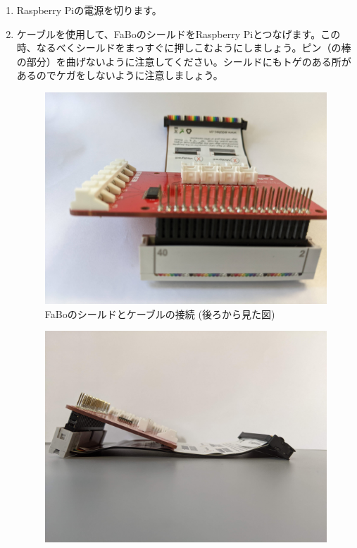 \begin{enumerate}
  \item Raspberry Piの電源を切ります。\\
  \item ケーブルを使用して、FaBoのシールドをRaspberry Piとつなげます。この時、なるべくシールドをまっすぐに押しこむようにしましょう。ピン（の棒の部分）を曲げないように注意してください。シールドにもトゲのある所があるのでケガをしないように注意しましょう。\\
  \begin{minipage}[b]{0.4\linewidth}
    \begin{figure}[H]
      \centering
      \includegraphics[width=.8\hsize]{images/chap05/fabo_and_cable_rearview.jpg}
      \caption{FaBoのシールドとケーブルの接続 (後ろから見た図)}
    \end{figure}
  \end{minipage}
  \begin{minipage}[b]{0.4\linewidth}
    \begin{figure}[H]
      \centering
      \includegraphics[width=.8\hsize]{images/chap05/fabo_and_cable_sideview.png}

\end{figure}
\end{minipage}
\end{enumerate}
